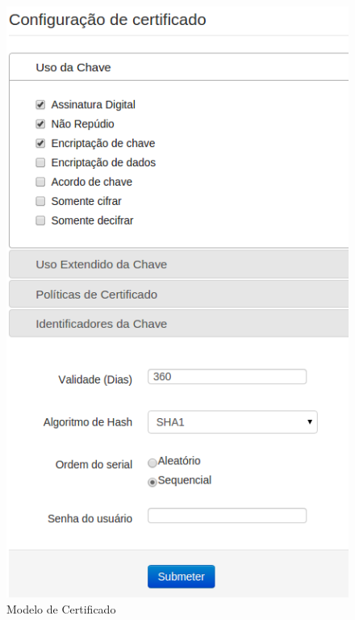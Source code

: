 \begin{figure}[ht]
     \centering
     \includegraphics[scale=0.5]{images/modelocert.png}
     \caption{Modelo de Certificado}
     \label{fig:modelocert}
\end{figure}

